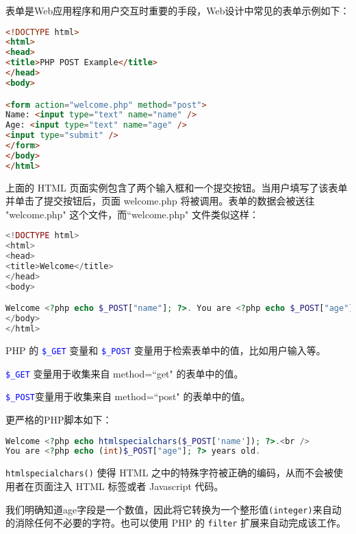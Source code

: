 \vspace{-30pt}

表单是Web应用程序和用户交互时重要的手段，Web设计中常见的表单示例如下：

\begin{lstlisting}[language=HTML]
<!DOCTYPE html>
<html>
<head>
<title>PHP POST Example</title>
</head>
<body>

<form action="welcome.php" method="post">
Name: <input type="text" name="name" />
Age: <input type="text" name="age" />
<input type="submit" />
</form>
</body>
</html>
\end{lstlisting}




上面的 HTML 页面实例包含了两个输入框和一个提交按钮。当用户填写了该表单并单击了提交按钮后，页面 welcome.php 将被调用。表单的数据会被送往 "welcome.php" 这个文件，而``welcome.php" 文件类似这样：

\begin{lstlisting}[language=PHP]
<!DOCTYPE html>
<html>
<head>
<title>Welcome</title>
</head>
<body>

Welcome <?php echo $_POST["name"]; ?>. You are <?php echo $_POST["age"]; ?> years old.
</body>
</html>
\end{lstlisting}

PHP 的 \textcolor{Blue}{\texttt{\$\_GET}} 变量和 \textcolor{Blue}{\texttt{\$\_POST}} 变量用于检索表单中的值，比如用户输入等。

\begin{compactitem}
\item \textcolor{Blue}{\texttt{\$\_GET}} 变量用于收集来自 method=``get" 的表单中的值。
\item \textcolor{Blue}{\texttt{\$\_POST}}变量用于收集来自 method=``post" 的表单中的值。
\end{compactitem}

更严格的PHP脚本如下：

\begin{lstlisting}[language=PHP]
Welcome <?php echo htmlspecialchars($_POST['name']); ?>.<br />
You are <?php echo (int)$_POST["age"]; ?> years old.
\end{lstlisting}


\texttt{htmlspecialchars()} 使得 HTML 之中的特殊字符被正确的编码，从而不会被使用者在页面注入 HTML 标签或者 Javascript 代码。



我们明确知道age字段是一个数值，因此将它转换为一个整形值\texttt{(integer)}来自动的消除任何不必要的字符。也可以使用 PHP 的 \texttt{filter} 扩展来自动完成该工作。

